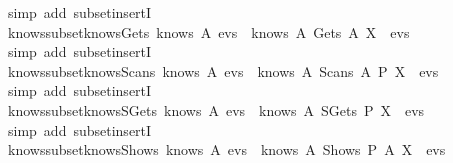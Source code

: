 \begin{isabellebody}
  \isadelimproof
  \endisadelimproof
  \isatagproof
  \isamarkupfalse%
  \ {\isacharparenleft}simp\ add{\isacharcolon}\ subset{\isacharunderscore}insertI{\isacharparenright}%
  \endisatagproof
  {\isafoldproof}%
  \isadelimproof
  \isanewline
  \endisadelimproof
  \isanewline
  \isamarkupfalse%
  \ knows{\isacharunderscore}subset{\isacharunderscore}knows{\isacharunderscore}Gets{\isacharcolon}\ {\isachardoublequoteopen}knows\ A\ evs\ {\isasymsubseteq}\ knows\ A\ {\isacharparenleft}Gets\ A{\isacharprime}\ X\ {\isacharhash}\ evs{\isacharparenright}{\isachardoublequoteclose}\isanewline
  \isadelimproof
  \endisadelimproof
  \isatagproof
  \isamarkupfalse%
  \ {\isacharparenleft}simp\ add{\isacharcolon}\ subset{\isacharunderscore}insertI{\isacharparenright}%
  \endisatagproof
  {\isafoldproof}%
  \isadelimproof
  \isanewline
  \endisadelimproof
  \isanewline
  \isamarkupfalse%
  \ knows{\isacharunderscore}subset{\isacharunderscore}knows{\isacharunderscore}Scans{\isacharcolon}\ {\isachardoublequoteopen}knows\ A\ evs\ {\isasymsubseteq}\ knows\ A\ {\isacharparenleft}Scans\ A{\isacharprime}\ P\ X\ {\isacharhash}\ evs{\isacharparenright}{\isachardoublequoteclose}\isanewline
  \isadelimproof
  \endisadelimproof
  \isatagproof
  \isamarkupfalse%
  \ {\isacharparenleft}simp\ add{\isacharcolon}\ subset{\isacharunderscore}insertI{\isacharparenright}%
  \endisatagproof
  {\isafoldproof}%
  \isadelimproof
  \isanewline
  \endisadelimproof
  \isanewline
  \isamarkupfalse%
  \ knows{\isacharunderscore}subset{\isacharunderscore}knows{\isacharunderscore}SGets{\isacharcolon}\ {\isachardoublequoteopen}knows\ A\ evs\ {\isasymsubseteq}\ knows\ A\ {\isacharparenleft}SGets\ P\ X\ {\isacharhash}\ evs{\isacharparenright}{\isachardoublequoteclose}\isanewline
  \isadelimproof
  \endisadelimproof
  \isatagproof
  \isamarkupfalse%
  \ {\isacharparenleft}simp\ add{\isacharcolon}\ subset{\isacharunderscore}insertI{\isacharparenright}%
  \endisatagproof
  {\isafoldproof}%
  \isadelimproof
  \isanewline
  \endisadelimproof
  \isanewline
  \isamarkupfalse%
  \ knows{\isacharunderscore}subset{\isacharunderscore}knows{\isacharunderscore}Shows{\isacharcolon}\ {\isachardoublequoteopen}knows\ A\ evs\ {\isasymsubseteq}\ knows\ A\ {\isacharparenleft}Shows\ P\ A{\isacharprime}\ X\ {\isacharhash}\ evs{\isacharparenright}{\isachardoublequoteclose}\isanewline
  \isadelimproof
  \endisadelimproof

\end{isabellebody}
